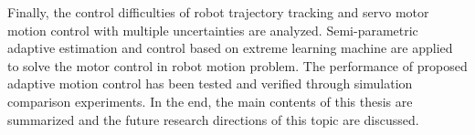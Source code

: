 \begin{englishabstract}
Finally, the control difficulties of robot trajectory tracking and servo motor motion control with multiple uncertainties are analyzed. Semi-parametric adaptive estimation and control based on extreme learning machine are applied to solve the motor control in robot motion problem. The performance of proposed adaptive motion control has been tested and verified through simulation comparison experiments. In the end, the main contents of this thesis are summarized and the future research directions of this topic are discussed.
   

\end{englishabstract}
